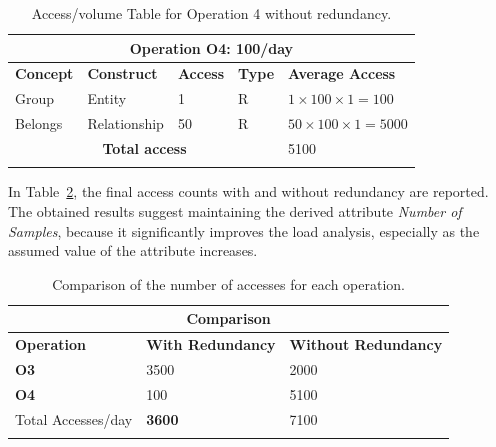 \begin{longtable}{|p{}|p{}|p{}|p{}|p{}|}
\hline
\multicolumn{5}{|c|}{\textbf{Operation O4: 100/day}}\\\hline
\textbf{Concept} & \textbf{Construct} & \textbf{Access} & \textbf{Type} & \textbf{Average Access} \\
\hline
Group & Entity & 1 & R & $1 \times 100 \times 1 = 100$\\
Belongs & Relationship & 50 & R & $50 \times 100 \times 1 = 5000$\\
\hline
\multicolumn{4}{|c|}{\textbf{Total access}} & 5100\\
\hline
\caption{Access/volume Table for Operation 4 without redundancy.}
\label{table:14}
\end{longtable}

In Table~\ref{table:15}, the final access counts with and without redundancy are reported. The obtained results suggest maintaining the derived attribute \textit{Number of Samples}, because it significantly improves the load analysis, especially as the assumed value of the attribute increases.

\begin{longtable}{|p{}|p{}|p{}|}
\hline
\multicolumn{3}{|c|}{\textbf{Comparison}}\\\hline
\textbf{Operation} & \textbf{With Redundancy} & \textbf{Without Redundancy}\\
\hline
\textbf{O3} &3500 &2000\\
\textbf{O4} &100 &5100\\
\hline
Total Accesses/day  & \textbf{3600} &7100\\
\hline
\caption{Comparison of the number of accesses for each operation.}
\label{table:15}
\end{longtable}

\newpage

